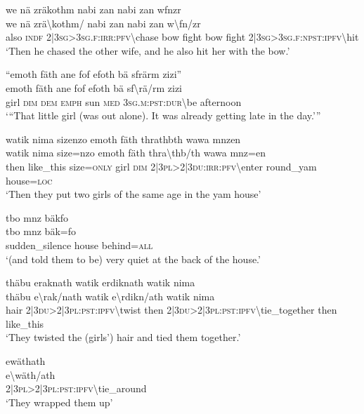 \ea\label{ex:6:a1258}
we nä zräkothm nabi zan nabi zan wfnzr\\
\gll we	nä	zrä{\textbackslash}kothm/	nabi	zan	nabi	zan	w{\textbackslash}fn/zr\\
     also	\textsc{indf}	2|3\textsc{sg}>3\textsc{sg}.\textsc{f}:\textsc{irr}:\textsc{pfv}{\textbackslash}chase	bow	fight	bow	fight	2|3\textsc{sg}>3\textsc{sg}.\textsc{f}:\textsc{npst}:\textsc{ipfv}{\textbackslash}hit\\
\glt `Then he chased the other wife, and he also hit her with the bow.'
\z

\ea\label{ex:6:a1259}
``emoth fäth ane fof efoth bä sfrärm zizi''\\
\gll emoth	fäth	ane	fof	efoth	bä	sf{\textbackslash}rä/rm	zizi\\
     girl	\textsc{dim}	\textsc{dem}	\textsc{emph}	sun	\textsc{med}	3\textsc{sg}.\textsc{m}:\textsc{pst}:\textsc{dur}{\textbackslash}be	afternoon\\
\glt `{``}That little girl (was out alone). It was already getting late in the day.'''
\z

\ea\label{ex:6:a1260}
watik nima sizenzo emoth fäth thrathbth wawa mnzen\\
\gll watik	nima	size=nzo	emoth	fäth	thra{\textbackslash}thb/th	wawa	mnz=en\\
     then	like\_this	size=\textsc{only}	girl	\textsc{dim}	2|3\textsc{pl}>2|3\textsc{du}:\textsc{irr}:\textsc{pfv}{\textbackslash}enter	round\_yam	house=\textsc{loc}\\
\glt `Then they put two girls of the same age in the yam house'
\z

\ea\label{ex:6:a1261}
tbo mnz bäkfo\\
\gll tbo	mnz	bäk=fo\\
     sudden\_silence	house	behind=\textsc{all}\\
\glt `(and told them to be) very quiet at the back of the house.'
\z

\ea\label{ex:6:a1263}
thäbu eraknath watik erdiknath watik nima\\
\gll thäbu	e{\textbackslash}rak/nath	watik	e{\textbackslash}rdikn/ath	watik	nima\\
     hair	2|3\textsc{du}>2|3\textsc{pl}:\textsc{pst}:\textsc{ipfv}{\textbackslash}twist	then	2|3\textsc{du}>2|3\textsc{pl}:\textsc{pst}:\textsc{ipfv}{\textbackslash}tie\_together	then	like\_this\\
\glt `They twisted the (girls') hair and tied them together.'
\z

\ea\label{ex:6:a1264}
ewäthath\\
\gll e{\textbackslash}wäth/ath\\
     2|3\textsc{pl}>2|3\textsc{pl}:\textsc{pst}:\textsc{ipfv}{\textbackslash}tie\_around\\
\glt `They wrapped them up'
\z

